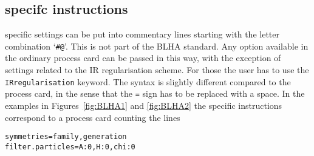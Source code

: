 

\subsection{\gosam specifc instructions}\label{sec:hashat_instructions}
\gosam specific settings can be put into commentary lines starting with the letter combination `\texttt{\#@}'. This is not part of the BLHA standard. Any option available in the ordinary \gosam process card can be passed in this way, with the exception of settings related to the IR regularisation scheme. For those the user has to use the \texttt{IRregularisation} keyword. The syntax is slightly different compared to the process card, in the sense that the \texttt{=} sign has to be replaced with a space. In the examples in Figures~\ref{fig:BLHA1} and \ref{fig:BLHA2} the specific instructions correspond to a process card counting the lines
\begin{lstlisting}[gobble=0,style=in]
symmetries=family,generation
filter.particles=A:0,H:0,chi:0
\end{lstlisting}

